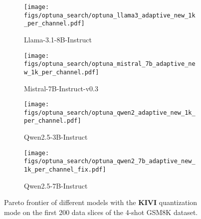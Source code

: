 \begin{figure*}
    \centering
    \begin{subfigure}{0.35\textwidth}
    \texttt{[image: figs/optuna\_search/optuna\_llama3\_adaptive\_new\_1k\_per\_channel.pdf]}
    \caption{Llama-3.1-8B-Instruct}
    \label{fig:pareto-frontiers-per-channel-asym-gsm8k-limit-200-llama3}
    \end{subfigure}
    \begin{subfigure}{0.35\textwidth}
    \texttt{[image: figs/optuna\_search/optuna\_mistral\_7b\_adaptive\_new\_1k\_per\_channel.pdf]}
    \caption{Mistral-7B-Instruct-v0.3}
    \label{fig:pareto-frontiers-per-channel-asym-gsm8k-limit-200-mistral}
    \end{subfigure}
    \begin{subfigure}{0.35\textwidth}
    \texttt{[image: figs/optuna\_search/optuna\_qwen2\_adaptive\_new\_1k\_per\_channel.pdf]}
    \caption{Qwen2.5-3B-Instruct}
    \label{fig:pareto-frontiers-per-channel-asym-gsm8k-limit-200-qwen2.5-3b}
    \end{subfigure}
    \begin{subfigure}{0.35\textwidth}
    \texttt{[image: figs/optuna\_search/optuna\_qwen2\_7b\_adaptive\_new\_1k\_per\_channel\_fix.pdf]}
    \caption{Qwen2.5-7B-Instruct}
    \label{fig:pareto-frontiers-per-channel-asym-gsm8k-limit-200-qwen2.5-7b}
    \end{subfigure}
    \caption{Pareto frontier of different models with the \textbf{KIVI} quantization mode on the first 200 data slices of the 4-shot GSM8K dataset.}
\label{fig:pareto-frontiers-per-channel-asym-gsm8k-limit-200}
\end{figure*}


